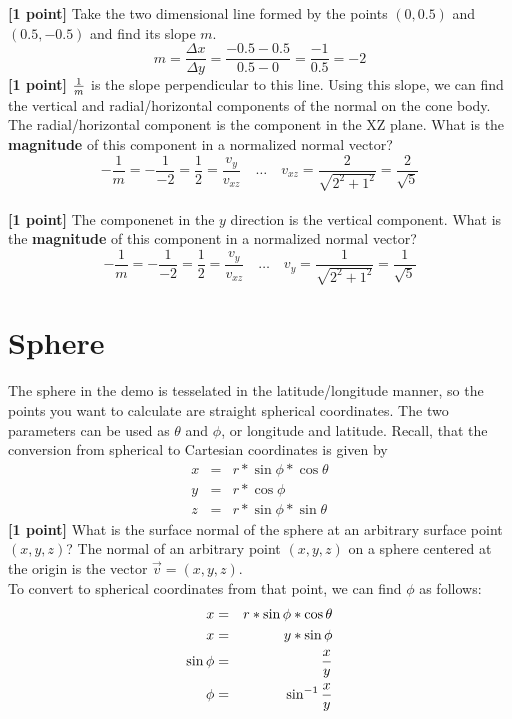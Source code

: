 \documentclass[10pt,twocolumn]{article}
\begin{document}
\vspace{2em}
{\bf [1 point]} Take the two dimensional line formed by the points $(0, 0.5)$ and $(0.5, -0.5)$ and find its slope $m$.
\vspace{2em}
\begin{equation*}
m = \frac{\Delta x}{\Delta y} = \frac{-0.5 - 0.5}{0.5 - 0} = \frac{-1}{0.5} = -2
\end{equation*}
\vspace{2em}
{\bf [1 point]} ${{1}\over{m}}$ is the slope perpendicular to this line. Using this slope, we
can find the vertical and radial/horizontal components of the normal on the cone body. The radial/horizontal component is the component in the XZ plane. What is the {\bf magnitude} of this component in a normalized normal vector?
\vspace{2em}
\begin{equation*}
-\frac{1}{m} = -\frac{1}{-2} = \frac{1}{2} = \frac{v_y}{v_{xz}}\quad \ldots \quad
v_{xz} = \frac{2}{\sqrt{2^2 + 1^2}} = \frac{2}{\sqrt{5}}
\end{equation*}
\vspace{2em}\\
{\bf [1 point]} The componenet in the $y$ direction is the vertical component. What is the {\bf magnitude} of this component in a normalized normal vector?
\vspace{2em}
\begin{equation*}
-\frac{1}{m} = -\frac{1}{-2} = \frac{1}{2} = \frac{v_y}{v_{xz}}\quad \ldots \quad
v_y = \frac{1}{\sqrt{2^2 + 1^2}} = \frac{1}{\sqrt{5}}
\end{equation*}

\section{Sphere}
The sphere in the demo is tesselated in the latitude/longitude manner, so the points you want to calculate are straight spherical coordinates. The two parameters can be used as $\theta$ and $\phi$, or longitude and latitude. Recall, that the conversion from spherical to Cartesian coordinates is given by
\begin{eqnarray*}
x & = & r * \sin{\phi} * \cos{\theta}\\
y & = & r * \cos{\phi}\\
z & = & r * \sin{\phi}*\sin{\theta}
\end{eqnarray*}
{\bf [1 point]} What is the surface normal of the sphere at an arbitrary surface point $(x,y,z)$?
\vspace{2em}
The normal of an arbitrary point $(x,y,z)$ on a sphere centered at the origin is the vector $\vec{v} = (x,y,z)$. \\
To convert to spherical coordinates from that point, we can find $\phi$ as follows: \\
\begin{eqnarray*}
x & = & r * \sin{\phi} * \cos{\theta}\\
x & = & y * \sin{\phi}\\
\sin{\phi} & = & {{x}\over{y}} \\
\phi & = & \sin^{-1}{{x}\over{y}} \\
\end{eqnarray*}
\end{document}
